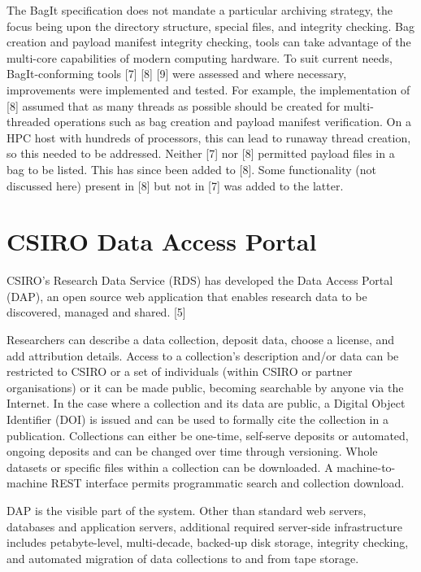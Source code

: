\documentclass{llncs}
\begin{document}
The BagIt specification does not mandate a particular archiving strategy, the
focus being upon the directory structure, special files, and integrity checking.
Bag creation and payload manifest integrity checking, tools can take advantage
of the multi-core capabilities of modern computing hardware. To suit current
needs, BagIt-conforming tools [7] [8] [9] were assessed and where necessary,
improvements were implemented and tested. For example, the implementation of [8]
assumed that as many threads as possible should be created for multi-threaded
operations such as bag creation and payload manifest verification. On a HPC host
with hundreds of processors, this can lead to runaway thread creation, so this
needed to be addressed. Neither [7] nor [8] permitted payload files in a bag to
be listed. This has since been added to [8]. Some functionality (not discussed
here) present in [8] but not in [7] was added to the latter.

\section{CSIRO Data Access Portal}
CSIRO's Research Data Service (RDS) has developed the Data Access Portal (DAP),
an open source web application that enables research data to be discovered,
managed and shared. [5]


Researchers can describe a data collection, deposit data, choose a license, and
add attribution details. Access to a collection’s description and/or data can be
restricted to CSIRO or a set of individuals (within CSIRO or partner
organisations) or it can be made public, becoming searchable by anyone via the
Internet. In the case where a collection and its data are public, a Digital
Object Identifier (DOI) is issued and can be used to formally cite the
collection in a publication. Collections can either be one-time, self-serve
deposits or automated, ongoing deposits and can be changed over time through
versioning. Whole datasets or specific files within a collection can be
downloaded. A machine-to-machine REST interface permits programmatic search and
collection download.


DAP is the visible part of the system. Other than standard web servers,
databases and application servers, additional required server-side
infrastructure includes petabyte-level, multi-decade, backed-up disk storage,
integrity checking, and automated migration of data collections to and from tape
storage.
\end{document}
